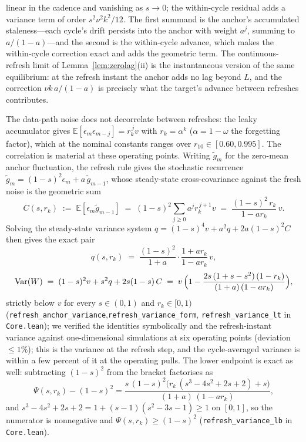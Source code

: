 linear in the cadence and vanishing as $s \to 0$; the within-cycle residual adds a variance term of order $s^2 \nu^2 k^2/12$.
The first summand is the anchor's accumulated staleness---each cycle's drift persists into the anchor with weight $a^j$, summing to $a/(1-a)$---and the second is the within-cycle advance, which makes the within-cycle correction exact and adds the geometric term.
The continuous-refresh limit of Lemma~\ref{lem:zerolag}(ii) is the instantaneous version of the same equilibrium: at the refresh instant the anchor adds no lag beyond $L$, and the correction $\nu k\,a/(1-a)$ is precisely what the target's advance between refreshes contributes.

The data-path noise does not decorrelate between refreshes: the leaky accumulator gives $\mathbb{E}[\epsilon_m \epsilon_{m-j}] = r_k^{\,j} v$ with $r_k = \alpha^k$ ($\alpha = 1-\omega$ the forgetting factor), which at the nominal constants ranges over $r_{10} \in [0.60, 0.995]$. The correlation is material at these operating points.
Writing $\tilde g_m$ for the zero-mean anchor fluctuation, the refresh rule gives the stochastic recurrence $\tilde g_m = (1-s)^2 \epsilon_m + a\,\tilde g_{m-1}$, whose steady-state cross-covariance against the fresh noise is the geometric sum
\[
  C(s,r_k) \;:=\; \mathbb{E}[\epsilon_m \tilde g_{m-1}]
  \;=\; (1-s)^2 \sum_{j \ge 0} a^j r_k^{\,j+1} v
  \;=\; \frac{(1-s)^2\,r_k}{1 - ar_k}\,v .
\]
Solving the steady-state variance system $q = (1-s)^4 v + a^2 q + 2a(1-s)^2 C$ then gives the exact pair
\[
  q(s,r_k) \;=\; \frac{(1-s)^2}{1+a}\cdot\frac{1+ar_k}{1-ar_k}\,v,
\]
\[
  \mathrm{Var}(W) \;=\; (1-s)^2 v + s^2 q + 2s(1-s)\,C
  \;=\; v\,\Bigl(1 - \frac{2s\,(1+s-s^2)\,(1-r_k)}{(1+a)\,(1-ar_k)}\Bigr),
\]
strictly below $v$ for every $s \in (0,1)$ and $r_k \in [0,1)$ (\texttt{refresh\_anchor\_variance},\newline\texttt{refresh\_variance\_form}, \texttt{refresh\_variance\_lt} in \texttt{Core.lean}); we verified the identities symbolically and the refresh-instant variance against one-dimensional simulations at six operating points (deviation $\le 1\%$); this is the variance at the refresh step, and the cycle-averaged variance is within a few percent of it at the operating pulls.
The lower endpoint is exact as well: subtracting $(1-s)^2$ from the bracket factorises as
\[
  \Psi(s,r_k)-(1-s)^2
  = \frac{s\,(1-s)^2\bigl(r_k\,(s^3-4s^2+2s+2)+s\bigr)}{(1+a)\,(1-ar_k)},
\]
and $s^3-4s^2+2s+2 = 1+(s-1)(s^2-3s-1) \ge 1$ on $[0,1]$, so the numerator is nonnegative and $\Psi(s,r_k)\ge(1-s)^2$ (\texttt{refresh\_variance\_lb} in \texttt{Core.lean}).
